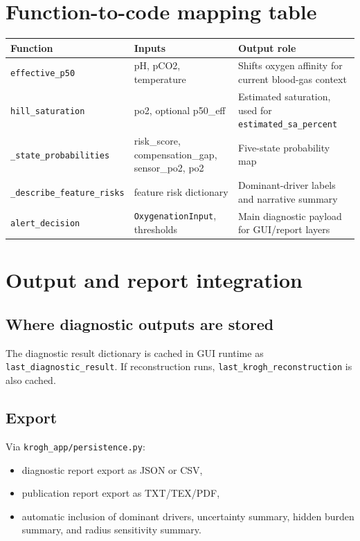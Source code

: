 \documentclass[12pt,a4paper]{article}
\begin{document}
\section{Function-to-code mapping table}
\begin{center}
\renewcommand{\arraystretch}{1.1}
\small
\begin{tabularx}{0.98\textwidth}{|>{\raggedright\arraybackslash}p{}|>{\raggedright\arraybackslash}p{}|>{\raggedright\arraybackslash}X|}
\hline
Function & Inputs & Output role \\
\hline
\texttt{effective\_p50} & pH, pCO2, temperature & Shifts oxygen affinity for current blood-gas context \\
\hline
\texttt{hill\_saturation} & po2, optional p50\_eff & Estimated saturation, used for \texttt{estimated\_sa\_percent} \\
\hline
\texttt{\_state\_probabilities} & risk\_score, compensation\_gap, sensor\_po2, po2 & Five-state probability map \\
\hline
\texttt{\_describe\_feature\_risks} & feature risk dictionary & Dominant-driver labels and narrative summary \\
\hline
\texttt{alert\_decision} & \texttt{OxygenationInput}, thresholds & Main diagnostic payload for GUI/report layers \\
\hline
\end{tabularx}
\normalsize
\end{center}

\section{Output and report integration}
\subsection{Where diagnostic outputs are stored}
The diagnostic result dictionary is cached in GUI runtime as \texttt{last\_diagnostic\_result}. If reconstruction runs, \texttt{last\_krogh\_reconstruction} is also cached.

\subsection{Export}
Via \texttt{krogh\_app/persistence.py}:
\begin{itemize}
    \item diagnostic report export as JSON or CSV,
    \item publication report export as TXT/TEX/PDF,
    \item automatic inclusion of dominant drivers, uncertainty summary, hidden burden summary, and radius sensitivity summary.
\end{itemize}
\end{document}

